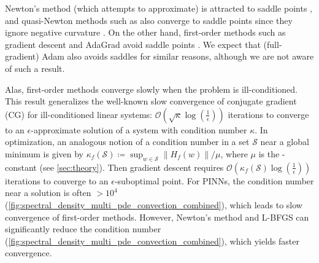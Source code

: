 Newton's method (which \lbfgs{} attempts to approximate) is attracted to saddle points \cite{dauphin2014identifying},  and quasi-Newton methods such as \lbfgs{} also converge to saddle points since they ignore negative curvature \cite{dauphin2014identifying}.
On the other hand, first-order methods such as gradient descent and AdaGrad \cite{duchi2011adaptive} avoid saddle points \cite{lee2019firstorder,antonakopoulos2022adagrad}.
We expect that (full-gradient) Adam also avoids saddles for similar reasons, although
we are not aware of such a result.

Alas, first-order methods converge slowly when the problem is ill-conditioned. 
This result generalizes the well-known slow convergence of conjugate gradient (CG)
for ill-conditioned linear systems:
 $\mathcal O (\sqrt \kappa \log(\frac{1}{\epsilon}))$ iterations to converge to an $\epsilon$-approximate solution of a system with condition number $\kappa$.
In optimization, an analogous notion of a condition number in a set $\mathcal S$ near a global minimum is given by $\kappa_{f}(\mathcal S) \coloneqq \sup_{w \in \mathcal S} \| H_f(w) \| / \mu$, where $\mu$ is the \PL-constant (see \cref{sec:theory}).
Then gradient descent requires $\mathcal O (\kappa_{f}(\mathcal S) \log(\frac{1}{\epsilon}))$ iterations to converge to an $\epsilon$-suboptimal point.
For PINNs, the condition number near a solution is often $> 10^{4}$ (\cref{fig:spectral_density_multi_pde_convection_combined}), which leads to slow convergence of first-order methods. 
However, Newton's method and L-BFGS can significantly reduce the condition number (\cref{fig:spectral_density_multi_pde_convection_combined}), which yields faster convergence. 


